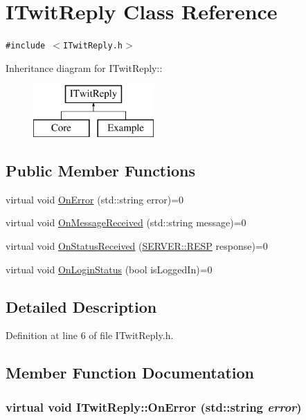 \hypertarget{classITwitReply}{
\section{ITwitReply Class Reference}
\label{classITwitReply}
}
{\tt \#include $<$ITwitReply.h$>$}

Inheritance diagram for ITwitReply::\begin{figure}[H]
\begin{center}
\leavevmode
\includegraphics[height=2cm]{classITwitReply}
\end{center}
\end{figure}
\subsection*{Public Member Functions}
\begin{CompactItemize}
\item 
virtual void \hyperlink{classITwitReply_9cc4c9da62c570e6e076f2a7ce52b75a}{OnError} (std::string error)=0
\item 
virtual void \hyperlink{classITwitReply_a103f872024b0a36e669b0d82a26a528}{OnMessageReceived} (std::string message)=0
\item 
virtual void \hyperlink{classITwitReply_9011b418bb62f734a2e3cd447815ec90}{OnStatusReceived} (\hyperlink{namespaceSERVER_e274de6af58152c34520420007dfa0ea}{SERVER::RESP} response)=0
\item 
virtual void \hyperlink{classITwitReply_691e9bcbe06bd66233b1c870d2e4d67d}{OnLoginStatus} (bool isLoggedIn)=0
\end{CompactItemize}


\subsection{Detailed Description}


Definition at line 6 of file ITwitReply.h.

\subsection{Member Function Documentation}
\hypertarget{classITwitReply_9cc4c9da62c570e6e076f2a7ce52b75a}{
\subsubsection{\setlength{\rightskip}{0pt plus 5cm}virtual void ITwitReply::OnError (std::string {\em error})}}
\label{classITwitReply_9cc4c9da62c570e6e076f2a7ce52b75a}




